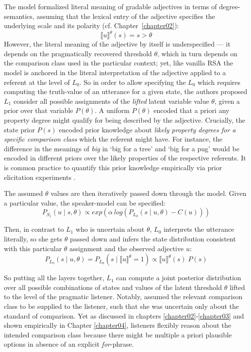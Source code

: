 The model formalized literal meaning of gradable adjectives in terms of degree-semantics, assuming that the lexical entry of the adjective specifies the underlying scale and its polarity (cf. Chapter~\ref{chapter02}):
\begin{equation}
\llbracket u \rrbracket^{\theta} (s) = s > \theta
\end{equation}
However, the literal meaning of the adjective by itself is underspecified --- it depends on the pragmatically recovered threshold $\theta$, which in turn depends on the comparison class used in the particular context; yet, like vanilla RSA the model is anchored in the literal interpretation of the adjective applied to a referent at the level of $L_0$.  
So in order to allow specifying the $L_0$ which requires computing the truth-value of an utterance for a given state, the authors proposed $L_1$ consider all possible assignments of the \emph{lifted} latent variable value $\theta$, given a prior over that variable $P(\theta)$. A uniform $P(\theta)$ encoded that a priori any property degree might qualify for being described by the adjective. Crucially, the state prior $P(s)$ encoded prior knowledge about \emph{likely property degrees for a specific comparison class} which the referent might have. For instance, the difference in the meanings of \emph{big} in `big for a tree' and `big for a pug' would be encoded in different priors over the likely properties of the respective referents. It is common practice to quantify this prior knowledge empirically via prior elicitation experiments \parencite{problang}.

The assumed $\theta$ values are then iteratively passed down through the model. Given a particular value, the speaker-model can be specified:
\begin{equation}
	P_{S_1} (u \mid s, \theta) \propto exp(\alpha \: log (P_{L_0} (s \mid u, \theta) - C(u)) )
\end{equation}	

Then, in contrast to $L_1$ who is uncertain about $\theta$, $L_0$ interprets the utterance literally, so she gets $\theta$ passed down and infers the state distribution consistent with this particular $\theta$ assignment and the observed adjective $u$:
\begin{equation}
P_{L_0} (s \mid u, \theta) = P_{L_0} (s \mid \llbracket u \rrbracket ^\theta = 1 ) \propto \llbracket u \rrbracket ^\theta (s) \; P(s)
\end{equation}

So putting all the layers together, $L_1$ can compute a joint posterior distribution over all possible combinations of states and values of the latent threshold $\theta$ lifted to the level of the pragmatic listener. Notably, \textcite{lassiter2013context} assumed the relevant comparison class to be supplied to the listener, such that she was uncertain only about the standard of comparison. Yet as discussed in chapters \ref{chapter02}-\ref{chapter03} and shown empirically in Chapter \ref{chapter04}, listeners flexibly reason about the intended comparison class because there might be multiple a priori plausible options in absence of an explicit \emph{for}-phrase.

